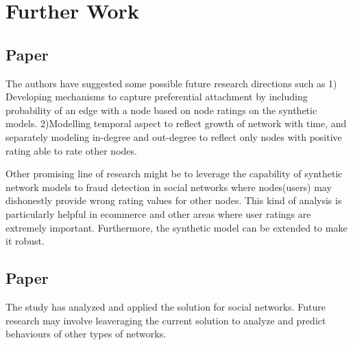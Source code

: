 
\section{Further Work}\label{sec:furtherl}
\subsection{Paper \cite{aw2018analyzing}}

The authors have suggested some possible future research directions such as 1) Developing mechanisms to capture preferential attachment by
including probability of an edge with a node based on node ratings on the synthetic models. 2)Modelling temporal aspect to reﬂect growth of network with time, and separately modeling in-degree and out-degree to reflect only nodes with positive rating able to rate other nodes.

Other promising line of research might be to leverage the capability of synthetic network models to fraud detection in social networks where nodes(users) may dishonestly provide wrong rating values for other nodes. This kind of analysis is particularly helpful in ecommerce and other areas where user ratings are extremely important. Furthermore, the synthetic model can be extended to make it robust.

\subsection{Paper \cite{kumar2016edge}}
The study has analyzed and applied the solution for social networks. Future research may involve leaveraging the current solution to analyze and predict behaviours of other types of networks.